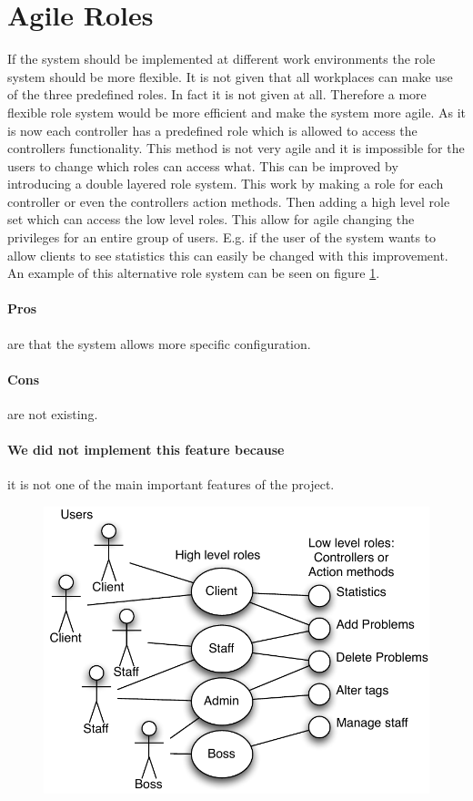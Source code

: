 \section{Agile Roles}
\label{sec:agile_roles}
If the system should be implemented at different work environments the role system should be more flexible. 
It is not given that all workplaces can make use of the three predefined roles. 
In fact it is not given at all. 
Therefore a more flexible role system would be more efficient and make the system more agile. 
As it is now each controller has a predefined role which is allowed to access the controllers functionality. 
This method is not very agile and it is impossible for the users to change which roles can access what. 
This can be improved by introducing a double layered role system.  
This work by making a role for each controller or even the controllers action methods. 
Then adding a high level role set which can access the low level roles. 
This allow for agile changing the privileges for an entire group of users. 
E.g. if the user of the system wants to allow clients to see statistics this can easily be changed with this improvement. An example of this alternative role system can be seen on figure \ref{fig:improved_role_system}.

\paragraph{Pros} are that the system allows more specific configuration. 
\paragraph{Cons} are not existing.
\paragraph{We did not implement this feature because} it is not one of the main important features of the project.

\begin{figure}
\begin{center}
\includegraphics[scale=1]{input/epilogue/improvements/improved_role_system.pdf}
\label{fig:improved_role_system}
\end{center}
\end{figure}
